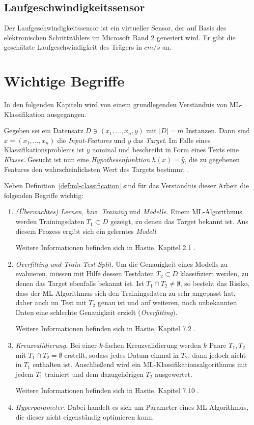 \subsection{Laufgeschwindigkeitssensor}
Der Laufgeschwindigkeitssensor ist ein virtueller Sensor, der auf Basis des elektronischen Schrittzählers im Microsoft Band 2 generiert wird. Er gibt die geschätzte Laufgeschwindigkeit des Trägers in $cm/s$ an.

\section{Wichtige Begriffe}
In den folgenden Kapiteln wird von einem grundlegenden Verständnis von \ac{ML}-Klassifikation ausgegangen.

\begin{definition}[\ac{ML}-Klassifikation]
\label{def:ml-classification}
Gegeben sei ein Datensatz $D \ni (x_1, ..., x_n, y)$ mit $|D| = m$ Instanzen. Dann sind $x = (x_1, ..., x_n)$ die \textit{Input-Features} und $y$ das \textit{Target}. Im Falle eines Klassifikationsproblems ist $y$ nominal und beschreibt in Form eines Texts eine \textit{Klasse}. Gesucht ist nun eine \textit{Hypothesenfunktion} $h(x) = \hat{y}$, die zu gegebenen Features den wahrscheinlichsten Wert des Targets bestimmt \cite{Ng2011a}.
\end{definition}
Neben Definition~\ref{def:ml-classification} sind für das Verständnis dieser Arbeit die folgenden Begriffe wichtig:
\begin{enumerate}
\item \textit{(Überwachtes) Lernen, bzw. Training} und \textit{Modelle.} Einem \ac{ML}-Algorithmus werden Trainingsdaten $T_1 \subset D$ gezeigt, zu denen das Target bekannt ist. Aus diesem Prozess ergibt sich ein gelerntes \textit{Modell}. 

Weitere Informationen befinden sich in Hastie, Kapitel 2.1 \cite{Hastie2009}.
\item \textit{Overfitting und Train-Test-Split.} Um die Genauigkeit eines Modells zu evaluieren, müssen mit Hilfe dessen Testdaten $T_2 \subset D$ klassifiziert werden, zu denen das Target ebenfalls bekannt ist. Ist $T_1 \cap T_2 \neq \emptyset$, so besteht das Risiko, dass der \ac{ML}-Algorithmus sich den Trainingsdaten zu sehr angepasst hat, daher auch im Test mit $T_2$ genau ist und auf weiteren, noch unbekannten Daten eine schlechte Genauigkeit erzielt (\textit{Overfitting}). 

Weitere Informationen befinden sich in Hastie, Kapitel 7.2 \cite{Hastie2009}.
\item \textit{Kreuzvalidierung.} Bei einer $k$-fachen Kreuzvalidierung werden $k$ Paare $T_1, T_2$ mit $T_1 \cap T_2 = \emptyset$ erstellt, sodass jedes Datum einmal in $T_2$, dann jedoch nicht in $T_1$ enthalten ist. Anschließend wird ein \ac{ML}-Klassifikationsalgorithmus mit jedem $T_1$ trainiert und dem dazugehörigen $T_2$ ausgewertet. 

Weitere Informationen befinden sich in Hastie, Kapitel 7.10 \cite{Hastie2009}.
\item \textit{Hyperparameter.}  Dabei handelt es sich um Parameter eines \ac{ML}-Algorithmus, die dieser nicht eigenständig optimieren kann.
\end{enumerate}


